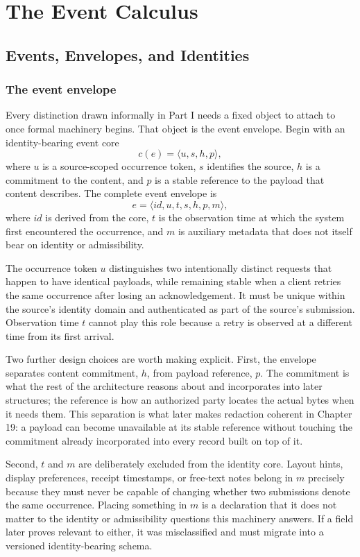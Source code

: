 \documentclass[11pt,openany]{book}
\begin{document}
\part{The Event Calculus}

\chapter{Events, Envelopes, and Identities}
\section{The event envelope}

Every distinction drawn informally in Part I needs a fixed object to attach to
once formal machinery begins. That object is the event envelope. Begin with an
identity-bearing event core
\[
  c(e)=\langle u,s,h,p\rangle,
\]
where \(u\) is a source-scoped occurrence token, \(s\) identifies the source,
\(h\) is a commitment to the content, and \(p\) is a stable reference to the
payload that content describes. The complete event envelope is
\[
  e=\langle id,u,t,s,h,p,m\rangle,
\]
where \(id\) is derived from the core, \(t\) is the observation time at which
the system first encountered the occurrence, and \(m\) is auxiliary metadata
that does not itself bear on identity or admissibility.

The occurrence token \(u\) distinguishes two intentionally distinct requests
that happen to have identical payloads, while remaining stable when a client
retries the same occurrence after losing an acknowledgement. It must be unique
within the source's identity domain and authenticated as part of the source's
submission. Observation time \(t\) cannot play this role because a retry is
observed at a different time from its first arrival.

Two further design choices are worth making explicit. First, the envelope
separates content commitment, \(h\), from payload reference, \(p\). The
commitment is what the rest of the architecture reasons about and incorporates
into later structures; the reference is how an authorized party locates the
actual bytes when it needs them. This separation is what later makes redaction
coherent in Chapter 19: a payload can become unavailable at its stable
reference without touching the commitment already incorporated into every
record built on top of it.

Second, \(t\) and \(m\) are deliberately excluded from the identity core.
Layout hints, display preferences, receipt timestamps, or free-text notes
belong in \(m\) precisely because they must never be capable of changing
whether two submissions denote the same occurrence. Placing something in
\(m\) is a declaration that it does not matter to the identity or admissibility
questions this machinery answers. If a field later proves relevant to either,
it was misclassified and must migrate into a versioned identity-bearing schema.
\end{document}

